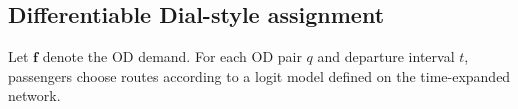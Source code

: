 \subsection{Differentiable Dial-style assignment}

Let $\bm{f}$ denote the OD demand. For each OD pair $q$ and departure interval $t$, passengers choose routes
according to a logit model defined on the time-expanded network.


